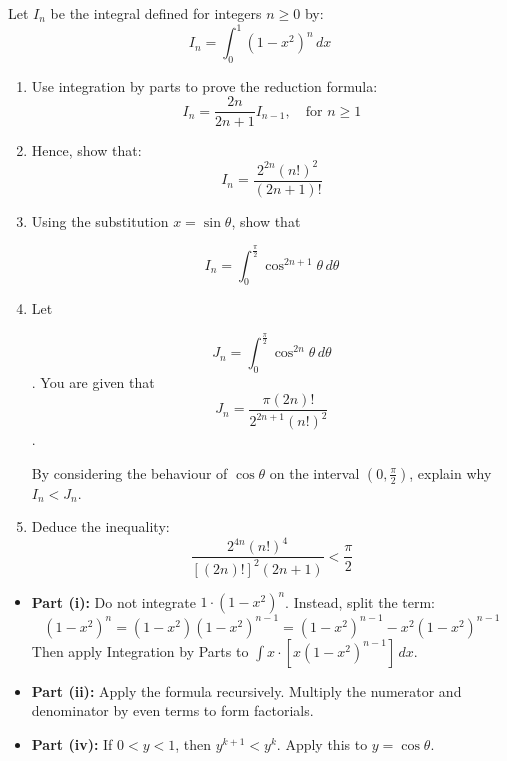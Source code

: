 \begin{problem}
Let $I_n$ be the integral defined for integers $n \ge 0$ by:
\[ I_n = \int_{0}^{1} (1-x^2)^n \, dx \]

\begin{enumerate}
    \item[(i)] Use integration by parts to prove the reduction formula:
    \[ I_n = \frac{2n}{2n+1} I_{n-1}, \quad \text{for } n \ge 1 \]
    
    \item[(ii)] Hence, show that:
    \[ I_n = \frac{2^{2n} (n!)^2}{(2n+1)!} \]
    
    \item[(iii)] Using the substitution $x = \sin\theta$, show that 
    
    \[ I_n = \int_{0}^{\frac{\pi}{2}} \cos^{2n+1}\theta \, d\theta \]
    
    \item[(iv)] Let 
    
    \[ J_n = \int_{0}^{\frac{\pi}{2}} \cos^{2n}\theta \, d\theta \]. 
    You are given that 
    \[ J_n = \frac{\pi (2n)!}{2^{2n+1} (n!)^2} \].

    By considering the behaviour of $\cos \theta$ on the interval $(0, \frac{\pi}{2})$, explain why $I_n < J_n$.
    
    \item[(v)] Deduce the inequality:
    \[ \frac{2^{4n} (n!)^4}{[(2n)!]^2 (2n+1)} < \frac{\pi}{2} \]
\end{enumerate}
\end{problem}

\begin{hint}
\begin{itemize}
    \item \textbf{Part (i):} Do not integrate $1 \cdot (1-x^2)^n$. Instead, split the term:
    \[ (1-x^2)^n = (1-x^2)(1-x^2)^{n-1} = (1-x^2)^{n-1} - x^2(1-x^2)^{n-1} \]
    Then apply Integration by Parts to $\int x \cdot [x(1-x^2)^{n-1}] \, dx$.
    \item \textbf{Part (ii):} Apply the formula recursively. Multiply the numerator and denominator by even terms to form factorials.
    \item \textbf{Part (iv):} If $0 < y < 1$, then $y^{k+1} < y^k$. Apply this to $y = \cos \theta$.
\end{itemize}
\end{hint}

